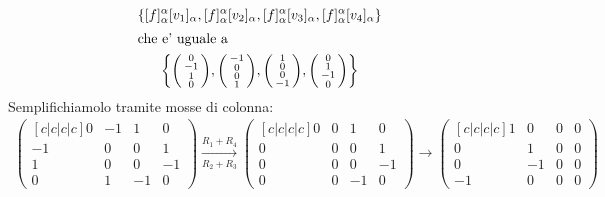 \begin{solution}
\begin{enumerate}
\begin{gather*}
            \left\{ [f]^{\alpha}_{\alpha}[v_1]_{\alpha}, [f]^{\alpha}_{\alpha}[v_2]_{\alpha}, [f]^{\alpha}_{\alpha}[v_3]_{\alpha}, [f]^{\alpha}_{\alpha}[v_4]_{\alpha}\right\} \\
            \intertext{che e' uguale a }
            \left\{\begin{psmallmatrix} 0 \\ -1 \\ 1 \\ 0 \end{psmallmatrix}, \begin{psmallmatrix} -1 \\ 0 \\ 0 \\ 1 \end{psmallmatrix}, \begin{psmallmatrix} 1 \\ 0 \\ 0 \\ -1 \end{psmallmatrix}, \begin{psmallmatrix} 0 \\ 1 \\ -1 \\ 0 \end{psmallmatrix}\right\}  
        \end{gather*}
        Semplifichiamolo tramite mosse di colonna: \begin{gather*}
            \begin{pmatrix}[c|c|c|c]
                0 & -1 & 1 & 0 \\ -1 & 0 & 0 & 1 \\
                1 & 0 & 0 & -1 \\ 0 & 1 & -1 & 0
            \end{pmatrix} \xrightarrow[R_2 + R_3]{R_1 + R_4}
            \begin{pmatrix}[c|c|c|c]
                0 & 0 & 1 & 0 \\ 0 & 0 & 0 & 1 \\
                0 & 0 & 0 & -1 \\ 0 & 0 & -1 & 0
            \end{pmatrix} \xrightarrow[]{}
            \begin{pmatrix}[c|c|c|c]
                1 & 0 & 0 & 0\\0 & 1 & 0 & 0 \\
                0 & -1 & 0 & 0\\ -1 & 0 & 0 & 0
            \end{pmatrix}

\end{gather*}
\end{enumerate}
\end{solution}

